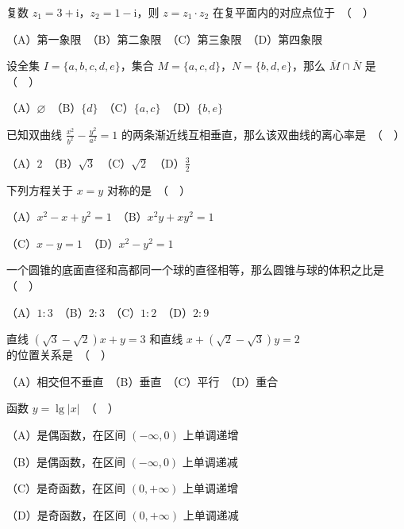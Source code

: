 \begin{question}
复数 $z_1 = 3 + \mathrm{i}$，$z_2 = 1 - \mathrm{i}$，则 $z = z_1 \cdot z_2$ 在复平面内的对应点位于　（　）

（A）第一象限　（B）第二象限　（C）第三象限　（D）第四象限

\end{question}
\begin{question}
设全集 $I = \{a, b, c, d, e\}$，集合 $M = \{a, c, d\}$，$N = \{b, d, e\}$，那么 $\overline{M} \cap \overline{N}$ 是　（　）

（A）$\varnothing$　（B）$\{d\}$　（C）$\{a, c\}$　（D）$\{b, e\}$

\end{question}
\begin{question}
已知双曲线 $\frac{x^2}{b^2} - \frac{y^2}{a^2} = 1$ 的两条渐近线互相垂直，那么该双曲线的离心率是　（　）

（A）$2$　（B）$\sqrt{3}$　（C）$\sqrt{2}$　（D）$\frac{3}{2}$

\end{question}
\begin{question}
下列方程关于 $x = y$ 对称的是　（　）

（A）$x^2 - x + y^2 = 1$　（B）$x^2 y + x y^2 = 1$

（C）$x - y = 1$　（D）$x^2 - y^2 = 1$

\end{question}
\begin{question}
一个圆锥的底面直径和高都同一个球的直径相等，那么圆锥与球的体积之比是　（　）

（A）$1:3$　（B）$2:3$　（C）$1:2$　（D）$2:9$

\end{question}
\begin{question}
直线 $(\sqrt{3} - \sqrt{2})x + y = 3$ 和直线 $x + (\sqrt{2} - \sqrt{3})y = 2$ 的位置关系是　（　）

（A）相交但不垂直　（B）垂直　（C）平行　（D）重合

\end{question}
\begin{question}
函数 $y = \lg |x|$　（　）

（A）是偶函数，在区间 $(-\infty, 0)$ 上单调递增

（B）是偶函数，在区间 $(-\infty, 0)$ 上单调递减

（C）是奇函数，在区间 $(0, +\infty)$ 上单调递增

（D）是奇函数，在区间 $(0, +\infty)$ 上单调递减

\end{question}
